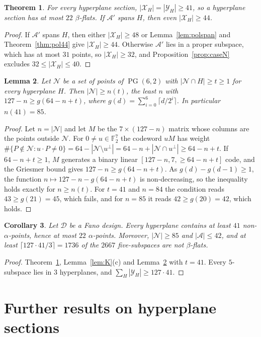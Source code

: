 \documentclass[11pt]{amsart}
\newtheorem{theorem}{Theorem}[section]
\newtheorem{lemma}[theorem]{Lemma}
\newtheorem{corollary}[theorem]{Corollary}
\theoremstyle{definition}
\newcommand{\F}{\mathbb{F}}
\newcommand{\D}{\mathcal{D}}
\newcommand{\X}{\mathcal{X}}
\newcommand{\Y}{\mathcal{Y}}
\newcommand{\N}{\mathcal{N}}
\newcommand{\A}{\mathcal{A}}
\newcommand{\PG}{\operatorname{PG}}
\begin{document}
\begin{theorem}\label{thm:41}
For every hyperplane section, $|\X_H|=|\Y_H|\ge41$, so a hyperplane section has at most $22$ $\beta$-flats. If $\A'$ spans $H$, then even $|\X_H|\ge44$.
\end{theorem}
\begin{proof}
If $\A'$ spans $H$, then either $|\X_H|\ge48$ or Lemma~\ref{lem:polspan} and Theorem~\ref{thm:pol44} give $|\X_H|\ge44$. Otherwise $\A'$ lies in a proper subspace, which has at most $31$ points, so $|\X_H|\ge32$, and Proposition~\ref{prop:caseN} excludes $32\le|\X_H|\le40$.
\end{proof}

\begin{lemma}\label{lem:griesmer}
Let $\N$ be a set of points of $\PG(6,2)$ with $|\N\cap H|\ge t\ge1$ for every hyperplane $H$. Then $|\N|\ge n(t)$, the least $n$ with $127-n\ge g(64-n+t)$, where $g(d)=\sum_{i=0}^{6}\lceil d/2^i\rceil$. In particular $n(41)=85$.
\end{lemma}
\begin{proof}
Let $n=|\N|$ and let $M$ be the $7\times(127-n)$ matrix whose columns are the points outside $\N$. For $0\ne u\in\F_2^7$ the codeword $uM$ has weight $\#\{P\notin\N: u\cdot P\ne0\}=64-|\N\setminus u^\perp|=64-n+|\N\cap u^\perp|\ge 64-n+t$. If $64-n+t\ge1$, $M$ generates a binary linear $[127-n,7,\ge64-n+t]$ code, and the Griesmer bound \cite{Gri60} gives $127-n\ge g(64-n+t)$. As $g(d)-g(d-1)\ge1$, the function $n\mapsto127-n-g(64-n+t)$ is non-decreasing, so the inequality holds exactly for $n\ge n(t)$. For $t=41$ and $n=84$ the condition reads $43\ge g(21)=45$, which fails, and for $n=85$ it reads $42\ge g(20)=42$, which holds.
\end{proof}

\begin{corollary}\label{cor:41}
Let $\D$ be a Fano design. Every hyperplane contains at least $41$ non-$\alpha$-points, hence at most $22$ $\alpha$-points. Moreover, $|\N|\ge85$ and $|\A|\le42$, and at least $\lceil127\cdot41/3\rceil=1736$ of the $2667$ five-subspaces are not $\beta$-flats.
\end{corollary}
\begin{proof}
Theorem~\ref{thm:41}, Lemma~\ref{lem:K}(c) and Lemma~\ref{lem:griesmer} with $t=41$. Every $5$-subspace lies in $3$ hyperplanes, and $\sum_H|\Y_H|\ge127\cdot41$.
\end{proof}

\section{Further results on hyperplane sections}\label{sec:dh}
\end{document}
